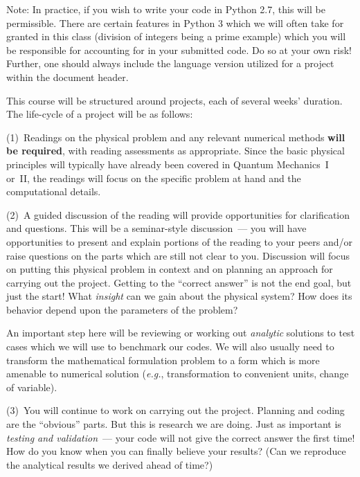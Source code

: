 \documentclass[12pt]{mcplain}
\begin{document}
Note: In practice, if you wish to write your code in Python 2.7, this will be permissible. There are certain features in Python 3 which we will often take for granted in this class (division of integers being a prime example) which you will be responsible for accounting for in your submitted code. Do so at your own risk! Further, one should always include the language version utilized for a project within the document header.


This course will be structured around projects, each of several weeks' duration.
The life-cycle of a project will be as follows:

\begin{leftindent}

  (1)~Readings on the physical problem and any relevant numerical methods
  \textbf{will be required}, with reading assessments as appropriate.  Since
  the basic physical principles will typically have already been covered in
  Quantum Mechanics~I or~II, the readings will focus on the specific problem at
  hand and the computational details.

  (2)~A guided discussion of the reading will provide opportunities for
  clarification and questions.  This will be a seminar-style discussion~--- you
  will have opportunities to present and explain portions of the reading to your
  peers and/or raise questions on the parts which are still not clear to you.
  Discussion will focus on putting this physical problem in context and on
  planning an approach for carrying out the project.  Getting to the ``correct
  answer'' is not the end goal, but just the start!  What \textit{insight} can
  we gain about the physical system?  How does its behavior depend upon the
  parameters of the problem?

  An important step here will be reviewing or working out \textit{analytic}
  solutions to test cases which we will use to benchmark our codes.  We will
  also usually need to transform the mathematical formulation problem to a form
  which is more amenable to numerical solution (\textit{e.g.}, transformation to
  convenient units, change of variable).

  (3)~You will continue to work on carrying out the project. Planning and coding
  are the ``obvious'' parts.  But this is research we are doing.  Just as
  important is \textit{testing and validation}~--- your code will not give the
  correct answer the first time!  How do you know when you can finally believe
  your results?  (Can we reproduce the analytical results we derived ahead of
  time?)


\end{leftindent}
\end{document}
